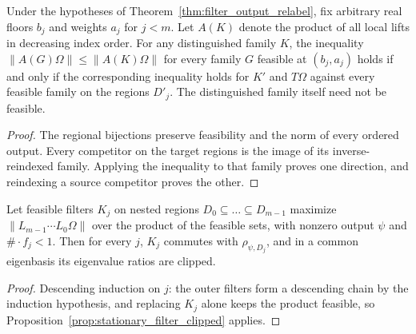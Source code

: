 \begin{theorem}
    \label{thm:filter_max_comparison_relabel}
    \leanok
    Under the hypotheses of Theorem~\ref{thm:filter_output_relabel}, fix
    arbitrary real floors $b_j$ and weights $a_j$ for $j<m$.
    Let $A(K)$ denote the product of all local lifts in decreasing index
    order. For any distinguished family $K$, the inequality
    $\|A(G)\Omega\|\le\|A(K)\Omega\|$ for every family $G$ feasible at
    $(b_j,a_j)$ holds if and only if the corresponding inequality holds
    for $K'$ and $T\Omega$ against every feasible family on the regions
    $D'_j$. The distinguished family itself need not be feasible.
\end{theorem}
\begin{proof}
    \leanok
    The regional bijections preserve feasibility and the norm of every
    ordered output. Every competitor on the target regions is the image
    of its inverse-reindexed family. Applying the inequality to that
    family proves one direction, and reindexing a source competitor
    proves the other.
\end{proof}


\begin{theorem}
    \label{thm:all_filters_clipped}
    \leanok
    Let feasible filters $K_j$ on nested regions $D_0\subseteq\dots\subseteq
        D_{m-1}$ maximize $\lVert L_{m-1}\cdots L_0\Omega\rVert$ over the product of
    the feasible sets, with nonzero output $\psi$ and $\#\cdot f_j<1$. Then for
    every $j$, $K_j$ commutes with $\rho_{\psi,D_j}$, and in a common eigenbasis
    its eigenvalue ratios are clipped.
\end{theorem}
\begin{proof}\leanok
    Descending induction on $j$: the outer filters form a descending chain by
    the induction hypothesis, and replacing $K_j$ alone keeps the product
    feasible, so Proposition~\ref{prop:stationary_filter_clipped} applies.
\end{proof}

